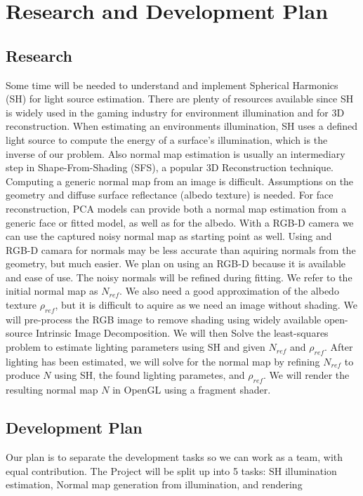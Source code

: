 \documentclass[10pt,twocolumn,letterpaper]{article}
\begin{document}
\section{Research and Development Plan}
\subsection{Research}
Some time will be needed to understand and implement Spherical Harmonics (SH) for light source estimation. There are plenty of resources available since SH is widely used in the gaming industry for environment illumination and for 3D reconstruction. When estimating an environments illumination, SH uses a defined light source to compute the energy of a surface's illumination, which is the inverse of our problem. Also normal map estimation is usually an intermediary step in Shape-From-Shading (SFS), a popular 3D Reconstruction technique. Computing a generic normal map from an image is difficult. Assumptions on the geometry and diffuse surface reflectance (albedo texture) is needed. For face reconstruction, PCA models can provide both a normal map estimation from a generic face or fitted model, as well as for the albedo. With a RGB-D camera we can use the captured noisy normal map as starting point as well. Using and RGB-D camara for normals may be less accurate than aquiring normals from the geometry, but much easier. We plan on using an RGB-D because it is available and ease of use. The noisy normals will be refined during fitting. We refer to the initial normal map as $N_{ref}$. We also need a good approximation of the albedo texture $\rho_{ref}$, but it is difficult to aquire as we need an image without shading. We will pre-process the RGB image to remove shading using widely available open-source Intrinsic Image Decomposition. We will then Solve the least-squares problem to estimate lighting parameters using SH and given $N_{ref}$ and $\rho_{ref}$. After lighting has been estimated, we will solve for the normal map by refining $N_{ref}$ to produce $N$ using SH, the found lighting parametes, and $\rho_{ref}$. We will render the resulting normal map $N$ in OpenGL using a fragment shader.

\subsection{Development Plan} 
Our plan is to separate the development tasks so we can work as a team, with equal contribution. The Project will be split up into 5 tasks: SH illumination estimation, Normal map generation from illumination, and rendering
\end{document}
